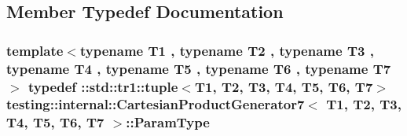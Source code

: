 \subsection{Member Typedef Documentation}
\hypertarget{classtesting_1_1internal_1_1_cartesian_product_generator7_ac749b651dcf74699c59f548cd33e40c1}{
\subsubsection[{Param\-Type}]{\setlength{\rightskip}{0pt plus 5cm}template$<$typename T1 , typename T2 , typename T3 , typename T4 , typename T5 , typename T6 , typename T7 $>$ typedef \-::{\bf std\-::tr1\-::tuple}$<$T1, T2, T3, T4, T5, T6, T7$>$ {\bf testing\-::internal\-::\-Cartesian\-Product\-Generator7}$<$ T1, T2, T3, T4, T5, T6, T7 $>$\-::{\bf Param\-Type}}}\label{classtesting_1_1internal_1_1_cartesian_product_generator7_ac749b651dcf74699c59f548cd33e40c1}


